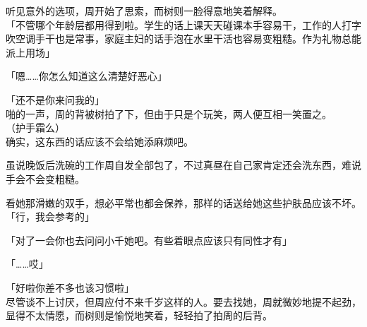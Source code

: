 听见意外的选项，周开始了思索，而树则一脸得意地笑着解释。\\

「不管哪个年龄层都用得到啦。学生的话上课天天碰课本手容易干，工作的人打字吹空调手干也是常事，家庭主妇的话手泡在水里干活也容易变粗糙。作为礼物总能派上用场」

「嗯……你怎么知道这么清楚好恶心」

「还不是你来问我的」\\

啪的一声，周的背被树拍了下，但由于只是个玩笑，两人便互相一笑置之。\\

（护手霜么）\\

确实，这东西的话应该不会给她添麻烦吧。

虽说晚饭后洗碗的工作周自发全部包了，不过真昼在自己家肯定还会洗东西，难说手会不会变粗糙。

看她那滑嫩的双手，想必平常也都会保养，那样的话送给她这些护肤品应该不坏。\\

「行，我会参考的」

「对了一会你也去问问小千她吧。有些着眼点应该只有同性才有」

「……哎」

「好啦你差不多也该习惯啦」\\

尽管谈不上讨厌，但周应付不来千岁这样的人。要去找她，周就微妙地提不起劲，显得不太情愿，而树则是愉悦地笑着，轻轻拍了拍周的后背。
